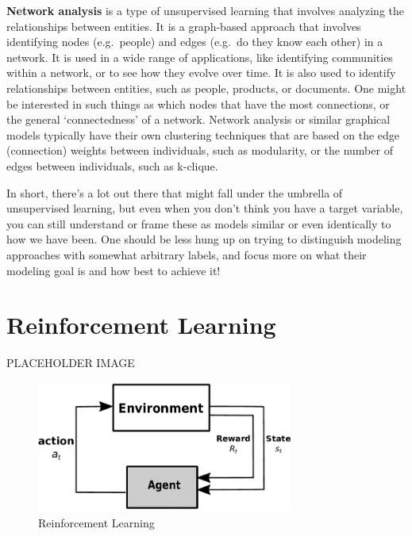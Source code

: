 \documentclass[
  letterpaper,
]{krantz}
\begin{document}
\textbf{Network analysis} is a type of unsupervised learning that
involves analyzing the relationships between entities. It is a
graph-based approach that involves identifying nodes (e.g.~people) and
edges (e.g.~do they know each other) in a network. It is used in a wide
range of applications, like identifying communities within a network, or
to see how they evolve over time. It is also used to identify
relationships between entities, such as people, products, or documents.
One might be interested in such things as which nodes that have the most
connections, or the general `connectedness' of a network. Network
analysis or similar graphical models typically have their own clustering
techniques that are based on the edge (connection) weights between
individuals, such as modularity, or the number of edges between
individuals, such as k-clique.

In short, there's a lot out there that might fall under the umbrella of
unsupervised learning, but even when you don't think you have a target
variable, you can still understand or frame these as models similar or
even identically to how we have been. One should be less hung up on
trying to distinguish modeling approaches with somewhat arbitrary
labels, and focus more on what their modeling goal is and how best to
achieve it!

\section{Reinforcement Learning}\label{reinforcement-learning}

PLACEHOLDER IMAGE

\begin{figure}

{\centering \includegraphics[width=0.75\textwidth,height=\textheight]{img/rl.png}

}

\caption{Reinforcement Learning}

\end{figure}
\end{document}
